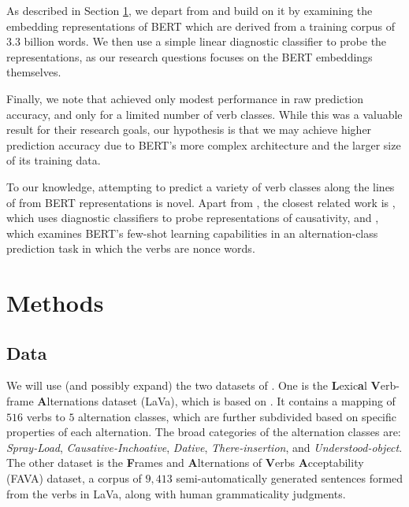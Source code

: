 \documentclass[11pt]{article}
\begin{document}
As described in Section \ref{sec:methods}, we depart from \citealt{kann-etal-2019-verb} and build on it by examining the embedding representations of BERT which are derived from a training corpus of $3.3$ billion words. We then use a simple linear diagnostic classifier to probe the representations, as our research questions focuses on the BERT embeddings themselves.

Finally, we note that \citet{kann-etal-2019-verb} achieved only modest performance in raw prediction accuracy, and only for a limited number of verb classes.  While this was a valuable result for their research goals, our hypothesis is that we may achieve higher prediction accuracy due to BERT's more complex architecture and the larger size of its training data.

To our knowledge, attempting to predict a variety of verb classes along the lines of \citealt{levin1993} from BERT representations is novel.  Apart from \citealt{kann-etal-2019-verb}, the closest related work is \citealt{causativity-neurons}, which uses diagnostic classifiers to probe representations of causativity, and \citealt{thrush2020investigating}, which examines BERT's few-shot learning capabilities in an alternation-class prediction task in which the verbs are nonce words.




\section{Methods}
\label{sec:methods}

\subsection{Data}
We will use (and possibly expand) the two datasets of \citet{kann-etal-2019-verb}.  One is the \textbf{L}exic\textbf{a}l \textbf{V}erb-frame \textbf{A}lternations dataset (LaVa), which is based on \citet{levin1993}.  It contains a mapping of $516$ verbs to $5$ alternation classes, which are further subdivided based on specific properties of each alternation.  The broad categories of the alternation classes are: \emph{Spray-Load}, \emph{Causative-Inchoative}, \emph{Dative}, \emph{There-insertion}, and \emph{Understood-object}.  The other dataset is the \textbf{F}rames and \textbf{A}lternations of \textbf{V}erbs \textbf{A}cceptability (FAVA) dataset, a corpus of $9,413$ semi-automatically generated sentences formed from the verbs in LaVa, along with human grammaticality judgments.
\end{document}
